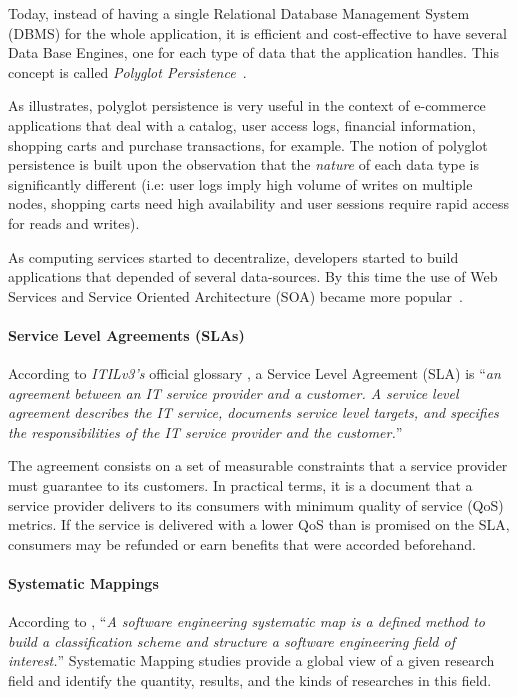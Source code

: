 \documentclass[]{tEIS2e}
\theoremstyle{plain}
\theoremstyle{remark}
\begin{document}
Today, instead of having a single Relational Database Management System (DBMS) for the whole application, it is efficient and cost-effective to have several Data Base Engines, one for each type of data that the application handles. 
This concept is called \textit{Polyglot Persistence}~\citep{sadalage2012nosql}.

As \citep{AdressingDataManagementCloud} illustrates, polyglot persistence is very useful in the context of  e-commerce applications that deal with a catalog, user access logs, financial information, shopping carts and purchase transactions, for example.
The notion of polyglot persistence is built upon the observation that the \textit{nature} of each data type is significantly different (i.e: user logs imply high volume of writes on multiple nodes, shopping carts need high availability and user sessions require rapid access for reads and writes). 

As computing services started to decentralize, developers started to build applications that depended of several data-sources. 
By this time the use of Web Services and Service Oriented Architecture (SOA) became more popular~\citep{Armbrust09m.:above}. 


\paragraph*{Service Level Agreements (SLAs)}
According to \textit{ITILv3's} official glossary \citep{itilv3glossary}, a Service Level Agreement (SLA) is ``\textit{an agreement between an IT service provider and a customer. 
A service level agreement describes the IT service, documents service level targets, and specifies the responsibilities of the IT service provider and the customer.}'' 

The agreement consists on a set of measurable constraints that a service provider must guarantee to its customers.
In practical terms, it is a document that a service provider delivers to its consumers with minimum quality of service (QoS) metrics. 
If the service is delivered with a lower QoS than is promised on the SLA, consumers may be refunded or earn benefits that were accorded beforehand.    

\paragraph*{Systematic Mappings}
According to \citep{Petersen:2008:SMS:2227115.2227123}, ``\textit{A software engineering systematic map is a defined method to build a classification scheme and structure a software engineering field of interest.}''
Systematic Mapping studies provide a global view of a given research field and identify the quantity, results, and the kinds of researches in this field.
\end{document}
